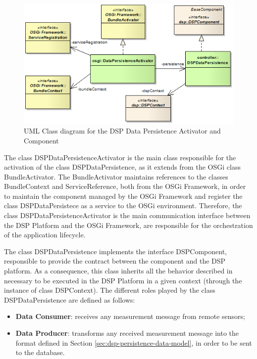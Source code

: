 \begin{figure}[!h]
  \centering
  \includegraphics[scale=0.65]{../diagrams/DSP-DataPersistence-Activator-Class-Diagram}
  \caption{UML Class diagram for the DSP Data Persistence Activator and Component}
  \label{fig:DSP-DataPersistence-Activator-Class-Diagram}
\end{figure}

The class DSPDataPersistenceActivator is the main class responsible for the
activation of the class DSPDataPersistence, as it extends from the OSGi
class BundleActivator. The BundleActivator maintains references to the classes
BundleContext and ServiceReference, both from the OSGi Framework, in order to
maintain the component managed by the OSGi Framework and register the class
DSPDataPersistece as a service to the OSGi environment. Therefore, the class
DSPDataPersistenceActivator is the main communication interface between the 
DSP Platform and the OSGi Framework, are responsible for the orchestration of
the application lifecycle.

The class DSPDataPersistence implements the interface DSPComponent, responsible
to provide the contract between the component and the DSP platform. As a
consequence, this class inherits all the behavior described in
\cite{netbeams-dsp-architecture} necessary to be executed in the DSP Platform
in a given context (through the instance of class DSPContext). The different
roles played by the class DSPDataPersistence are defined as follows:

\begin{itemize}
  \item \textbf{Data Consumer}: receives any measurement message from remote
  sensors;
  \item \textbf{Data Producer}: transforms any received measurement message
  into the format defined in Section \ref{sec:dsp-persistence-data-model}, in
  order to be sent to the database.
\end{itemize}

